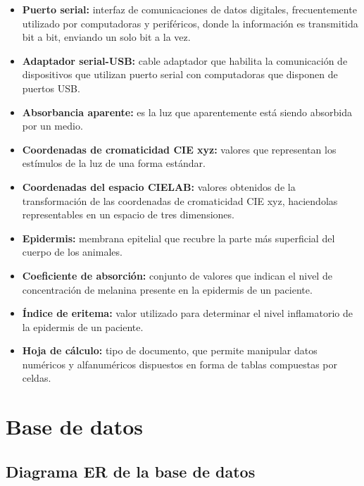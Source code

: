 \begin{itemize}
	\item \textbf{Puerto serial:} interfaz de comunicaciones de datos digitales, frecuentemente utilizado por computadoras y perif\'{e}ricos, donde la informaci\'{o}n es transmitida bit a bit, enviando un solo bit a la vez.
	
	\item \textbf{Adaptador serial-USB:} cable adaptador que habilita la comunicaci\'{o}n de dispositivos que utilizan puerto serial con computadoras que disponen de puertos USB.
	
	\item \textbf{Absorbancia aparente:} es la luz que aparentemente est\'{a} siendo absorbida por un medio.
	
	\item \textbf{Coordenadas de cromaticidad CIE xyz:} valores que representan los est\'{i}mulos de la luz de una forma est\'{a}ndar.
	
	\item \textbf{Coordenadas del espacio CIELAB:} valores obtenidos de la transformaci\'{o}n de las coordenadas de cromaticidad CIE xyz, haciendolas representables en un espacio de tres dimensiones.
	
	\item \textbf{Epidermis:} membrana epitelial que recubre la parte m\'{a}s superficial del cuerpo de los animales.	
	
	\item \textbf{Coeficiente de absorci\'{o}n:} conjunto de valores que indican el nivel de concentraci\'{o}n de melanina presente en la epidermis de un paciente.
	
	\item \textbf{\'{I}ndice de eritema:} valor utilizado para determinar el nivel inflamatorio de la epidermis de un paciente.
	
	\item \textbf{Hoja de c\'{a}lculo:} tipo de documento, que permite manipular datos num\'{e}ricos y alfanum\'{e}ricos dispuestos en forma de tablas compuestas por celdas.
	
\end{itemize}

\newpage

\section{Base de datos}

	\subsection{Diagrama ER de la base de datos}

